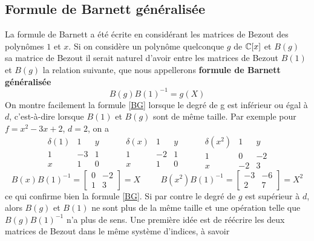 \documentclass{standalone}
\begin{document}
  \subsection{Formule de Barnett généralisée}
  \label{Bar_gen}
  La formule de Barnett a été écrite en considérant les matrices de Bezout des polynômes $1$ et $x$.
  Si on considère un polynôme quelconque $g$ de $\mathbb{C}[x]$ et $B(g)$ sa matrice de Bezout il serait naturel d'avoir entre les matrices de Bezout $B(1)$ et $B(g)$ la relation suivante, que nous appellerons {\bf formule de Barnett généralisée}
  \begin{equation}
  	\label{BG}
  	B(g)B(1)^{-1} = g(X)
  \end{equation}
  On montre facilement la formule \ref{BG} lorsque le degré de g est inférieur ou égal à $d$, c'est-à-dire lorsque $B(1)$ et $B(g)$ sont de même taille. Par exemple pour $f = x^2 - 3x + 2$, $d = 2$, on a
  $$
  \begin{array}{c|cc}
  	\delta(1) & 1 & y \\
  	\hline
  	1 & -3 & 1 \\
  	x & 1 & 0
  \end{array}
  \hspace{1cm}
  \begin{array}{c|cc}
  	\delta(x) & 1 & y \\
  	\hline
  	1 & -2 & 1 \\
  	x & 1 & 0
  \end{array}
  \hspace{1cm}
  \begin{array}{c|cc}
  	\delta(x^2) & 1 & y \\
  	\hline
  	1 & 0 & -2 \\
  	x & -2 & 3
  \end{array}
  $$
  \begin{equation}
  	B(x)B(1)^{-1} =
  	\begin{bmatrix}
  		0 & -2 \\
  		1 & 3
  	\end{bmatrix}
  	= X
  	\hspace{1cm}
  	B(x^2)B(1)^{-1} =
  	\begin{bmatrix}
  		-3 & -6 \\
  		2 & 7
  	\end{bmatrix}
  	= X^2
  \end{equation}
  ce qui confirme bien la formule \ref{BG}.
  Si par contre le degré de $g$ est supérieur à $d$, alors $B(g)$ et $B(1)$ ne sont plus de la même taille et une opération telle que $B(g)B(1)^{-1}$ n'a plus de sens. Une première idée est de réécrire les deux matrices de Bezout dans le même système d'indices, à savoir
\end{document}
